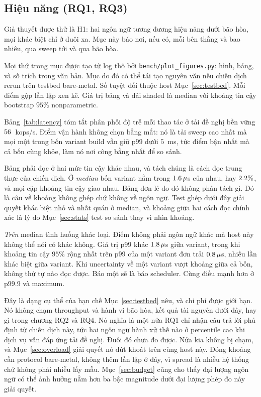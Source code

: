 \subsection{Hiệu năng (RQ1, RQ3)}\label{sec:perfresults}
Giả thuyết được thử là H1: hai ngôn ngữ tương đương hiệu năng dưới
bão hòa, mọi khác biệt chỉ ở đuôi xa. Mục này báo nơi, nếu
có, mỗi bên thắng và bao nhiêu, qua sweep tới và qua bão hòa.

Mọi thứ trong mục được tạo từ log thô bởi \texttt{bench/plot\_figures.py}: hình,
bảng, và số trích trong văn bản. Mục do đó có thể tái tạo
nguyên văn nếu chiến dịch rerun trên testbed bare-metal. Số tuyệt đối thuộc
host Mục~\ref{sec:testbed}. Mỗi điểm gộp \NRepeats{} lần lặp xen kẽ.
Giá trị bảng và dải shaded là median với khoảng tin cậy bootstrap $95\%$
nonparametric.

Bảng~\ref{tab:latency} tóm tắt phân phối độ trễ mỗi thao tác ở tải đề nghị
bền vững $56$~kops/s. Điểm vận hành không chọn bằng mắt: nó là
tải sweep cao nhất mà mọi một trong bốn variant build vẫn giữ p99 dưới
$5$~ms, tức điểm bận nhất mà cả bốn cùng khỏe, làm
nó nơi công bằng nhất để so sánh.

Bảng phải đọc ở hai mức tin cậy khác nhau, và tách chúng là
cách đọc trung thực của chiến dịch. Ở \emph{median} bốn variant nằm trong
$1.6\,\mu$s của nhau, hay $2.2\%$, và mọi cặp khoảng tin cậy
giao nhau. Bảng đơn lẻ do đó không phân tách gì.
Đó là câu về khoảng không ghép chứ không về ngôn ngữ. Test ghép
dưới đây giải quyết khác biệt nhỏ và nhất quán ở median, và khoảng giữa
hai cách đọc chính xác là lý do Mục~\ref{sec:stats} test so sánh thay vì
nhìn khoảng.

\emph{Trên} median tình huống khác loại. Điểm không phải ngôn ngữ khác mà host này không thể nói có khác không. Giá trị p99 khác
$1.8\,\mu$s giữa variant, trong khi khoảng tin cậy $95\%$ rộng nhất trên
p99 của một variant đơn trải $0.8\,\mu$s, nhiều lần khác biệt
giữa variant. Khi uncertainty về một variant vượt khoảng giữa cả bốn, không
thứ tự nào đọc được. Báo một sẽ là báo scheduler. Cùng điều
mạnh hơn ở p99.9 và maximum.

Đây là dạng cụ thể của hạn chế Mục~\ref{sec:testbed} nêu, và chi phí được
giới hạn. Nó không chạm throughput và hành vi bão hòa, kết quả tài nguyên dưới đây,
hay gì trong chương RQ2 và RQ4. Nó nghĩa là một nửa RQ1 chỉ nhận
câu trả lời phủ định từ chiến dịch này, tức hai ngôn ngữ hành xử thế nào ở percentile cao
khi dịch vụ vẫn đáp ứng tải đề nghị. Đuôi đó chưa đo được. Nửa kia
không bị chạm, và Mục~\ref{sec:overload} giải quyết nó dứt khoát trên cùng host này.
Đóng khoảng cần protocol bare-metal, không thêm lần lặp ở đây, vì spread là
nhiễu hệ thống chứ không phải nhiễu lấy mẫu. Mục~\ref{sec:budget} cũng cho thấy
đại lượng ngôn ngữ có thể ảnh hưởng nằm hơn ba bậc magnitude dưới đại lượng
phép đo này giải quyết.

